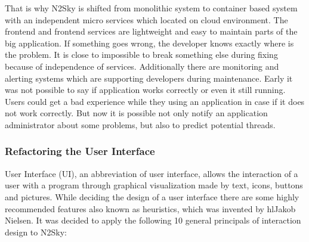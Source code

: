 \begin{description}
That is why N2Sky is shifted from monolithic system to container based system with an independent micro services which located on cloud environment. 
The frontend and frontend services are lightweight and easy to maintain parts of the big application. If something goes wrong, the developer knows exactly where is the problem. It is close to impossible to break something else during fixing because of independence of services. 
Additionally there are monitoring and alerting systems which are supporting developers during maintenance.  Early it was not possible to say if application works correctly or even it still running. Users could get a bad experience while they using an application in case if it does not work correctly. But now it is possible not only notify an application administrator about some problems, but also to predict potential threads. 
\end{description}


\subsubsection{Refactoring the User Interface}\label{Refactoring the User Interface}

User Interface (UI), an abbreviation of user interface, allows the interaction of a user with a program through graphical visualization made by text, icons, buttons and pictures. While deciding the design of a user interface there are some highly recommended features also known as heuristics, which was invented by hl{Jakob Nielsen}. It was decided to apply the following 10 general principals of interaction design to N2Sky:

